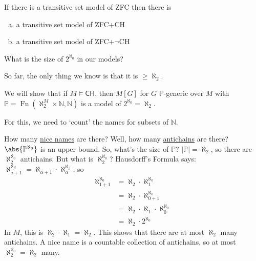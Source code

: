 \documentclass{article}
\newcommand{\p}{\mathbb{P}}
\newcommand{\1}{\mathbbm{1}}
\DeclareMathOperator{\Fn}{Fn}
\let\models\vDash
\begin{document}
\begin{cor}
  If there is a transitive set model of \textsf{ZFC} then there is
  \begin{enumerate}[(a)]
    \item a transitive set model of \textsf{ZFC+CH}
    \item a transitive set model of \textsf{ZFC+$\neg$CH}
  \end{enumerate}
\end{cor}
\begin{question}
  What is the size of $2^{\aleph_0}$ in our models?
\end{question}
So far, the only thing we know is that it is $ \geq \aleph_2 $.

We will show that if $M \models \textsf{CH}$, then \hyperlink{def:mg}{$M[G]$} for $G$ $\p$-generic over $M$ with $\p = \Fn(\aleph_2^M \times \mathbb{N}, \mathbb{N})$ is a model of $2^{\aleph_0} = \aleph_2$.

For this, we need to `count' the names for subsets of $\mathbb{N}$.
How many \hyperlink{def:nicename}{nice names} are there?
Well, how many \hyperlink{def:antichain}{antichains} are there? $\abs{\p^{\aleph_0}}$ is an upper bound. So, what's the size of $\p$?
$|\p| = \aleph_2$, so there are $\aleph_2^{\aleph_0}$ antichains.
But what is $\aleph_2^{\aleph_0}$? Hausdorff's Formula says: $\aleph_{a+1}^{\aleph_\beta} = \aleph_{\alpha+1} \cdot \aleph_\alpha^{\aleph_\beta}$, so
\begin{align*}
  \aleph_{1+1}^{\aleph_0} &= \aleph_2 \cdot \aleph_1^{\aleph_0} \\
                        &= \aleph_2 \cdot \aleph_{0+1}^{\aleph_0} \\
                        &= \aleph_2 \cdot \aleph_1 \cdot \aleph_0^{\aleph_0} \\
                        &= \aleph_2 \cdot 2^{\aleph_0}
\end{align*}
In $M$, this is $\aleph_2 \cdot \aleph_1 = \aleph_2$.
This shows that there are at most $\aleph_2$ many antichains.
A nice name is a countable collection of antichains, so at most $\aleph_2^{\aleph_0} = \aleph_2$ many.
\end{document}

